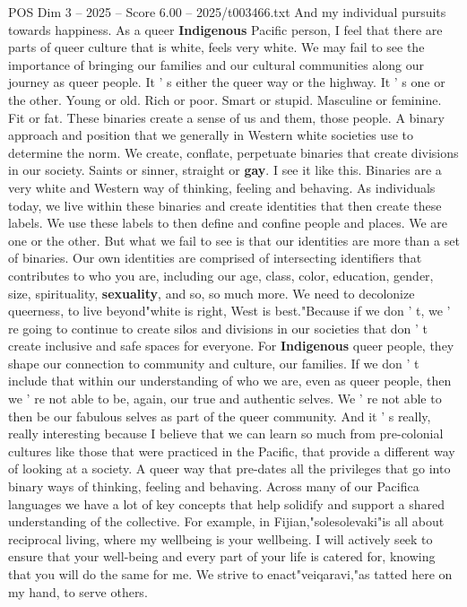\begin{textsample}{POS Dim 3 – 2025 – Score 6.00 – 2025/t003466.txt}
And my individual pursuits towards happiness.
As a queer \textbf{Indigenous} Pacific person, I feel that there are parts of queer culture that is white, feels very white.
We may fail to see the importance of bringing our families and our cultural communities along our journey as queer people.
It ' s either the queer way or the highway.
It ' s one or the other.
Young or old.
Rich or poor.
Smart or stupid.
Masculine or feminine.
Fit or fat.
These binaries create a sense of us and them, those people.
A binary approach and position that we generally in Western white societies use to determine the norm.
We create, conflate, perpetuate binaries that create divisions in our society.
Saints or sinner, straight or \textbf{gay}.
I see it like this.
Binaries are a very white and Western way of thinking, feeling and behaving.
As individuals today, we live within these binaries and create identities that then create these labels.
We use these labels to then define and confine people and places.
We are one or the other.
But what we fail to see is that our identities are more than a set of binaries.
Our own identities are comprised of intersecting identifiers that contributes to who you are, including our age, class, color, education, gender, size, spirituality, \textbf{sexuality}, and so, so much more.
We need to decolonize queerness, to live beyond"white is right, West is best."Because if we don ' t, we ' re going to continue to create silos and divisions in our societies that don ' t create inclusive and safe spaces for everyone.
For \textbf{Indigenous} queer people, they shape our connection to community and culture, our families.
If we don ' t include that within our understanding of who we are, even as queer people, then we ' re not able to be, again, our true and authentic selves.
We ' re not able to then be our fabulous selves as part of the queer community.
And it ' s really, really interesting because I believe that we can learn so much from pre-colonial cultures like those that were practiced in the Pacific, that provide a different way of looking at a society.
A queer way that pre-dates all the privileges that go into binary ways of thinking, feeling and behaving.
Across many of our Pacifica languages we have a lot of key concepts that help solidify and support a shared understanding of the collective.
For example, in Fijian,"solesolevaki"is all about reciprocal living, where my wellbeing is your wellbeing.
I will actively seek to ensure that your well-being and every part of your life is catered for, knowing that you will do the same for me.
We strive to enact"veiqaravi,"as tatted here on my hand, to serve others.

\end{textsample}
